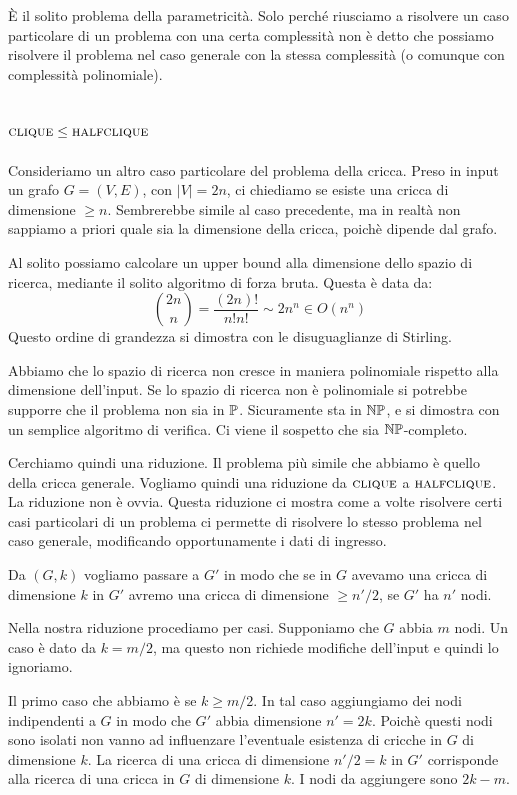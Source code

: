 È il solito problema della parametricità. Solo perché riusciamo a risolvere un caso particolare
di un problema con una certa complessità non è detto che possiamo risolvere il problema nel caso
generale con la stessa complessità (o comunque con complessità polinomiale).

\subsection{$\textsc{clique} \leq \textsc{halfclique}$}

Consideriamo un altro caso particolare del problema della cricca. Preso in input un grafo $G=(V,E)$,
con $|V| = 2n$, ci chiediamo se esiste una cricca di dimensione $\geq n$. Sembrerebbe simile al caso
precedente, ma in realtà non sappiamo a priori quale sia la dimensione della cricca, poichè
dipende dal grafo.

Al solito possiamo calcolare un upper bound alla dimensione dello spazio di ricerca, mediante il
solito algoritmo di forza bruta. Questa è data da:
\begin{equation*}
    \binom{2n}{n} = \frac{(2n)!}{n!n!} \sim 2n^{n} \in O(n^{n})
\end{equation*}
Questo ordine di grandezza si dimostra con le disuguaglianze di Stirling.

Abbiamo che lo spazio di ricerca non cresce in maniera polinomiale rispetto alla dimensione
dell'input. Se lo spazio di ricerca non è polinomiale si potrebbe supporre che il problema non sia
in $\mathbb{P}$. Sicuramente sta in $\mathbb{NP}$, e si dimostra con un semplice algoritmo di verifica. Ci
viene il sospetto che sia $\mathbb{NP}$-completo.

Cerchiamo quindi una riduzione. Il problema più simile che abbiamo è quello della cricca generale.
Vogliamo quindi una riduzione da $\textsc{clique}$ a $\textsc{halfclique}$. La riduzione non è ovvia. Questa
riduzione ci mostra come a volte risolvere certi casi particolari di un problema ci permette di
risolvere lo stesso problema nel caso generale, modificando opportunamente i dati di ingresso.

Da $(G,k)$ vogliamo passare a $G'$ in modo che se in $G$ avevamo una cricca di dimensione $k$ in
$G'$ avremo una cricca di dimensione $\geq n'/2$, se $G'$ ha $n'$ nodi.

Nella nostra riduzione procediamo per casi. Supponiamo che $G$ abbia $m$ nodi. Un caso è dato da $k
= m/2$, ma questo non richiede modifiche dell'input e quindi lo ignoriamo.

Il primo caso che abbiamo è se $k \geq m/2$.  In tal caso aggiungiamo dei nodi indipendenti a $G$
in modo che $G'$ abbia dimensione $n' = 2k$. Poichè questi nodi sono isolati non vanno ad
influenzare l'eventuale esistenza di cricche in $G$ di dimensione $k$. La ricerca di una cricca di
dimensione $n'/2 = k$ in $G'$ corrisponde alla ricerca di una cricca in $G$ di dimensione $k$. I
nodi da aggiungere sono $2k - m$.

